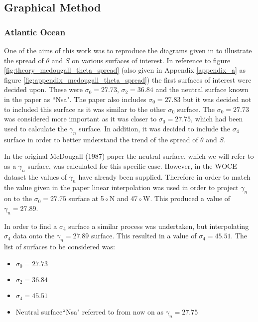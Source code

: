 \subsection{Graphical Method}
\label{subsection:spreadmethod}
\subsubsection{Atlantic Ocean}
\label{subsubsection:spreadmethodatlanticocean}

One of the aims of this work was to reproduce the diagrams given in \citet{McDougall1987} to illustrate the spread of $\theta$ and $S$ on various surfaces of interest.  In reference to figure \ref{fig:theory_mcdougall_theta_spread} (also given in Appendix \ref{appendix_a} as figure \ref{fig:appendix_mcdougall_theta_spread}) the first surfaces of interest were decided upon. These were $\sigma_0 = 27.73$, $\sigma_2 = 36.84$ and the neutral surface known in the paper as ``Nsa". The paper also includes $\sigma_0 = 27.83$ but it was decided not to included this surface as it was similar to the other $\sigma_0$ surface. The $\sigma_0 = 27.73$ was considered more important as it was closer to $\sigma_0 = 27.75$, which had been used to calculate the $\gamma_n$ surface. In addition, it was decided to include the $\sigma_4$ surface in order to better understand the trend of the spread of $\theta$ and $S$.

In the original McDougall (1987) paper the neutral surface, which we will refer to  as  a $\gamma_n$ surface,  was  calculated  for  this  specific  case.  However,  in  the  WOCE dataset the values of $\gamma_n$ have already been supplied.  Therefore in order to match the value given in the paper linear interpolation was used in order to project $\gamma_n$ on to the $\sigma_0= 27.75$ surface at 5◦N and 47◦W.  This produced a value of $\gamma_n= 27.89$.

In order to find a $\sigma_4$ surface a similar process was undertaken, but interpolating $\sigma_4$ data onto the $\gamma_n = 27.89$ surface. This resulted in a value of $\sigma_4 = 45.51$. The list of surfaces to be considered was:

\begin{itemize}
    \item $\sigma_0= 27.73$ 
    \item $\sigma_2= 36.84$ 
    \item $\sigma_4= 45.51$ 
    \item Neutral surface``Nsa" referred to from now on as $\gamma_n= 27.75$
\end{itemize}

